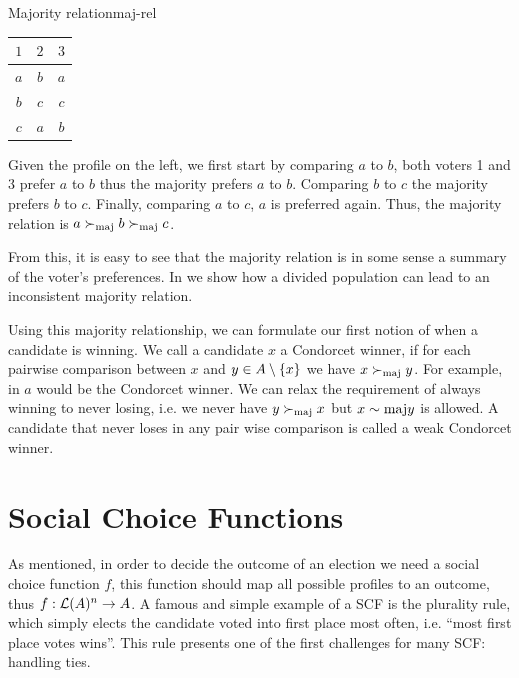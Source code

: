 \begin{example}{Majority relation}{maj-rel}
	\begin{minipage}{0.15\linewidth}
		\begin{tabular}{ccc}
			\toprule
			$1$ & $2$ & $3$ \\
			\midrule
			$a$ & $b$ & $a$ \\
			$b$ & $c$ & $c$ \\
			$c$ & $a$ & $b$ \\
			\bottomrule
		\end{tabular}
	\end{minipage}
	\hspace{0.02\linewidth}
	\begin{minipage}{0.78\linewidth}
		Given the profile on the left, we
		first start by comparing $a$ to $b$, both voters 1 and 3 prefer
		$a$ to $b$ thus the majority prefers $a$ to $b$. Comparing
		$b$ to $c$ the majority prefers $b$ to $c$. Finally, comparing
		$a$ to $c$, $a$ is preferred again. Thus, the majority relation
		is $a \succ_{\textnormal{maj}} b \succ_{\textnormal{maj}} c$.
	\end{minipage}
\end{example}

From this, it is easy to see that the majority relation is in some sense a
summary of the voter's preferences. In 
we show how a divided population can lead to an inconsistent majority relation.

Using this majority relationship, we can formulate our first notion of when a
candidate is winning. We call a candidate $x$ a Condorcet winner, if for
each pairwise comparison between $x$ and $y \in A\setminus
	\{x\}$ we have $x \succ_{\textnormal{maj}} y$. For example, in  $a$ would be
the Condorcet winner. We can relax the requirement of always winning to never
losing, i.e. we never have $y \succ_{\textnormal{maj}} x$ but $x \sim{\textnormal{maj}} y$ is allowed. A
candidate that never loses in any pair wise comparison is called a weak
Condorcet winner.

\section{Social Choice Functions} \label{sec:SCF}

As mentioned, in order to decide the outcome of an election we need a social
choice function $f$, this function should map all possible profiles to an
outcome, thus $f: \mathcal{L}(A)^n \to A$. A famous and
simple example of a SCF is the plurality rule, which simply elects the
candidate voted into first place most often, i.e. ``most first place votes
wins''. This rule presents one of the first challenges for many SCF: handling ties.

